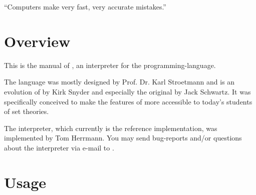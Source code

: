 


\globalDate{\today}







\begin{titlepage}
\maketitle

\vfill

\begin{center}
\Large
``Computers make very fast, very accurate mistakes.''
\end{center}

\vfill
\tableofcontents
\end{titlepage}

\section{Overview}

This is the manual of \setlX, an interpreter for the \SetlX{} programming-language.

The \SetlX{} language was mostly designed by Prof. Dr. Karl Stroetmann and is an evolution of \SetlTwo{} by Kirk Snyder and especially the original \Setl{} by Jack Schwartz. It was specifically conceived to make the features of \Setl{} more accessible to today's students of set theories.

The \setlX{} interpreter, which currently is the \SetlX{} reference implementation, was implemented by Tom Herrmann. You may send bug-reports and\slash{}or questions about the \setlX{} interpreter via e-mail to .

\section{Usage}


